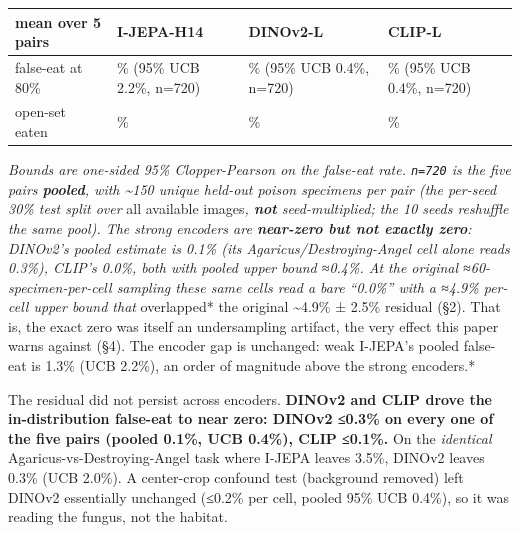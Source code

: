 {\def\LTcaptype{none} %
\begin{longtable}[]{@{}
  >{\raggedright\arraybackslash}p{}
  >{\raggedright\arraybackslash}p{}
  >{\raggedright\arraybackslash}p{}
  >{\raggedright\arraybackslash}p{}@{}}
\toprule\noalign{}
\begin{minipage}[b]{\linewidth}\raggedright
mean over 5 pairs
\end{minipage} & \begin{minipage}[b]{\linewidth}\raggedright
I-JEPA-H14
\end{minipage} & \begin{minipage}[b]{\linewidth}\raggedright
DINOv2-L
\end{minipage} & \begin{minipage}[b]{\linewidth}\raggedright
CLIP-L
\end{minipage} \\
\midrule\noalign{}
\endhead
\bottomrule\noalign{}
\endlastfoot
false-eat at 80\% & 1.3\% (95\% UCB 2.2\%, n=720) & 0.1\% (95\% UCB
0.4\%, n=720) & 0.0\% (95\% UCB 0.4\%, n=720) \\
open-set eaten & 27\% & 0\% & 3\% \\
\end{longtable}
}

\emph{Bounds are one-sided 95\% Clopper-Pearson on the false-eat rate.
\texttt{n=720} is the five pairs \textbf{pooled}, with
\textasciitilde150 unique held-out poison specimens per pair (the
per-seed 30\% test split over }all available images\emph{, \textbf{not}
seed-multiplied; the 10 seeds reshuffle the same pool). The strong
encoders are \textbf{near-zero but not exactly zero}: DINOv2's pooled
estimate is 0.1\% (its Agaricus/Destroying-Angel cell alone reads
0.3\%), CLIP's 0.0\%, both with pooled upper bound ≈0.4\%. At the
original ≈60-specimen-per-cell sampling these same cells read a bare
``0.0\%'' with a ≈4.9\% per-cell upper bound that }overlapped* the
original \textasciitilde4.9\% ± 2.5\% residual (§2). That is, the exact
zero was itself an undersampling artifact, the very effect this paper
warns against (§4). The encoder gap is unchanged: weak I-JEPA's pooled
false-eat is 1.3\% (UCB 2.2\%), an order of magnitude above the strong
encoders.*

The residual did not persist across encoders. \textbf{DINOv2 and CLIP
drove the in-distribution false-eat to near zero: DINOv2 ≤0.3\% on every
one of the five pairs (pooled 0.1\%, UCB 0.4\%), CLIP ≤0.1\%.} On the
\emph{identical} Agaricus-vs-Destroying-Angel task where I-JEPA leaves
3.5\%, DINOv2 leaves 0.3\% (UCB 2.0\%). A center-crop confound test
(background removed) left DINOv2 essentially unchanged (≤0.2\% per cell,
pooled 95\% UCB 0.4\%), so it was reading the fungus, not the habitat.

